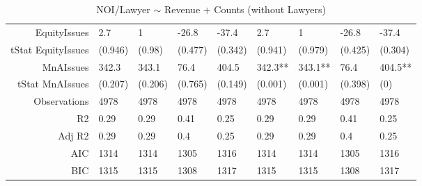 \begin{table}[ht]
\begin{tabular}{rllllllll}
  EquityIssues & 2.7 & 1 & -26.8 & -37.4 & 2.7 & 1 & -26.8 & -37.4 \\ 
  tStat EquityIssues & (0.946) & (0.98) & (0.477) & (0.342) & (0.941) & (0.979) & (0.425) & (0.304) \\ 
  MnAIssues & 342.3 & 343.1 & 76.4 & 404.5 & 342.3** & 343.1** & 76.4 & 404.5** \\ 
  tStat MnAIssues & (0.207) & (0.206) & (0.765) & (0.149) & (0.001) & (0.001) & (0.398) & (0) \\ 
  Observations & 4978 & 4978 & 4978 & 4978 & 4978 & 4978 & 4978 & 4978 \\ 
  R2 & 0.29 & 0.29 & 0.41 & 0.25 & 0.29 & 0.29 & 0.41 & 0.25 \\ 
  Adj R2 & 0.29 & 0.29 & 0.4 & 0.25 & 0.29 & 0.29 & 0.4 & 0.25 \\ 
  AIC & 1314 & 1314 & 1305 & 1316 & 1314 & 1314 & 1305 & 1316 \\ 
  BIC & 1315 & 1315 & 1308 & 1317 & 1315 & 1315 & 1308 & 1317 \\ 
   \hline
\end{tabular}
\caption{NOI/Lawyer $\sim$ Revenue + Counts (without Lawyers)} 
\end{table}
